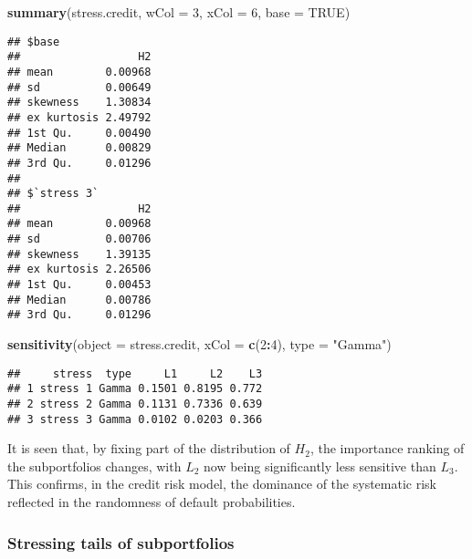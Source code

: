 \documentclass[
]{article}
\newenvironment{Shaded}{\begin{snugshade}}{\end{snugshade}}
\newcommand{\DataTypeTok}[1]{\textcolor[rgb]{0.13,0.29,0.53}{#1}}
\newcommand{\DecValTok}[1]{\textcolor[rgb]{0.00,0.00,0.81}{#1}}
\newcommand{\KeywordTok}[1]{\textcolor[rgb]{0.13,0.29,0.53}{\textbf{#1}}}
\newcommand{\NormalTok}[1]{#1}
\newcommand{\OperatorTok}[1]{\textcolor[rgb]{0.81,0.36,0.00}{\textbf{#1}}}
\newcommand{\OtherTok}[1]{\textcolor[rgb]{0.56,0.35,0.01}{#1}}
\newcommand{\StringTok}[1]{\textcolor[rgb]{0.31,0.60,0.02}{#1}}
\begin{document}
\begin{Shaded}
\begin{Highlighting}[]
\KeywordTok{summary}\NormalTok{(stress.credit, }\DataTypeTok{wCol =} \DecValTok{3}\NormalTok{, }\DataTypeTok{xCol =} \DecValTok{6}\NormalTok{, }\DataTypeTok{base =} \OtherTok{TRUE}\NormalTok{)}
\end{Highlighting}
\end{Shaded}

\begin{verbatim}
## $base
##                  H2
## mean        0.00968
## sd          0.00649
## skewness    1.30834
## ex kurtosis 2.49792
## 1st Qu.     0.00490
## Median      0.00829
## 3rd Qu.     0.01296
## 
## $`stress 3`
##                  H2
## mean        0.00968
## sd          0.00706
## skewness    1.39135
## ex kurtosis 2.26506
## 1st Qu.     0.00453
## Median      0.00786
## 3rd Qu.     0.01296
\end{verbatim}

\begin{Shaded}
\begin{Highlighting}[]
\KeywordTok{sensitivity}\NormalTok{(}\DataTypeTok{object =}\NormalTok{ stress.credit, }\DataTypeTok{xCol =} \KeywordTok{c}\NormalTok{(}\DecValTok{2}\OperatorTok{:}\DecValTok{4}\NormalTok{), }\DataTypeTok{type =} \StringTok{"Gamma"}\NormalTok{)}
\end{Highlighting}
\end{Shaded}

\begin{verbatim}
##     stress  type     L1     L2    L3
## 1 stress 1 Gamma 0.1501 0.8195 0.772
## 2 stress 2 Gamma 0.1131 0.7336 0.639
## 3 stress 3 Gamma 0.0102 0.0203 0.366
\end{verbatim}

It is seen that, by fixing part of the distribution of \(H_2\), the importance ranking of the subportfolios changes, with \(L_2\) now being significantly less sensitive than \(L_3\). This confirms, in the credit risk model, the dominance of the systematic risk reflected in the randomness of default probabilities.

\hypertarget{stressing-tails-of-subportfolios}{%
\subsubsection{Stressing tails of subportfolios}\label{stressing-tails-of-subportfolios}}
\end{document}

